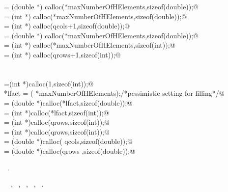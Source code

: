 \documentclass{article}
\begin{document}
\begin{flushleft}
\begin{minipage}{\linewidth}
\begin{list}{}{}
\mbox{}\verb@tb = (double *) calloc(*maxNumberOfHElements,sizeof(double));@\\
\mbox{}\verb@jtb = (int *) calloc(*maxNumberOfHElements,sizeof(double));@\\
\mbox{}\verb@itb = (int *) calloc(qcols+1,sizeof(double));@\\
\mbox{}\verb@b = (double *) calloc(*maxNumberOfHElements,sizeof(double));@\\
\mbox{}\verb@jb = (int *) calloc(*maxNumberOfHElements,sizeof(int));@\\
\mbox{}\verb@ib = (int *) calloc(qrows+1,sizeof(int));@\\
\mbox{}\verb@@\\
\mbox{}\verb@@\\
\mbox{}\verb@lfact =(int *)calloc(1,sizeof(int));@\\
\mbox{}\verb@*lfact = (  *maxNumberOfHElements);/*pessimistic setting for filling*/@\\
\mbox{}\verb@fact = (double *)calloc(*lfact,sizeof(double));@\\
\mbox{}\verb@irnf = (int *)calloc(*lfact,sizeof(int));@\\
\mbox{}\verb@iptrl = (int *)calloc(qrows,sizeof(int));@\\
\mbox{}\verb@iptru = (int *)calloc(qrows,sizeof(int));@\\
\mbox{}\verb@x = (double *)calloc(  qcols,sizeof(double));@\\
\mbox{}\verb@nsSumC = (double *)calloc(qrows ,sizeof(double));@\\
\mbox{}\verb@@{\NWsep}
\end{list}
\vspace{-1.5ex}
\footnotesize
\begin{list}{}{\setlength{\itemsep}{-\parsep}\setlength{\itemindent}{-\leftmargin}}
\item \NWtxtMacroRefIn\ .
\item \NWtxtIdentsUsed\nobreak\  \verb@info@\nobreak\ , \verb@iw@\nobreak\ , \verb@maxNumberOfHElements@\nobreak\ , \verb@w@\nobreak\ , \verb@x@\nobreak\ .
\item{}
\end{list}
\end{minipage}\vspace{4ex}
\end{flushleft}
\end{document}
